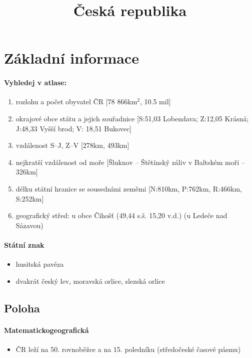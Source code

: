 \title{Česká republika}


\section{Základní informace}
\paragraph{Vyhledej v atlase:}
\begin{enumerate}
\item rozlohu a počet obyvatel ČR [78 866km$^2$, 10.5 mil]
\item okrajové obce státu a jejich souřadnice [S:51,03 Lobendava; Z:12,05 Krásná; J:48,33 Vyšší brod; V: 18,51 Bukovec]
\item vzdálenost S--J, Z--V [278km, 493km]
\item nejkratší vzdálenost od moře [Šluknov -- Štětínský záliv v Baltském moři -- 326km]
\item délku státní hranice se sousedními zeměmi [N:810km, P:762km, R:466km, S:252km]
\item geografický střed: u obce Čihošť (49,44 s.š. 15,20 v.d.) (u Ledeče nad Sázavou)
\end{enumerate}

\paragraph{Státní znak}
\begin{itemize}
\item husitská pavéza
\item dvakrát český lev, moravská orlice, slezská orlice
\end{itemize}

\subsection{Poloha}
\paragraph{Matematickogeografická}
\begin{itemize}
\item ČR leží na 50. rovnoběžce a na 15. poledníku (středočeské časové pásmu)
\end{itemize}

